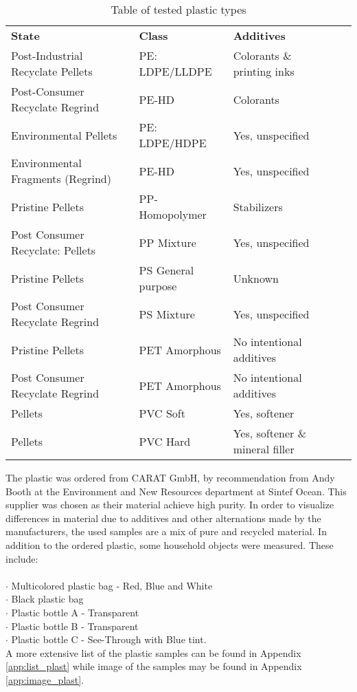 \begin{center}
\begin{table}[H]
\begin{tabular}{ |l|l|l|l|l| } 
 \hline
 \textbf{State} & \textbf{Class} & \textbf{Additives}\\ 
Post-Industrial Recyclate Pellets & PE: LDPE/LLDPE & Colorants \& printing inks\\
Post-Consumer Recyclate Regrind & PE-HD & Colorants\\
Environmental Pellets & PE: LDPE/HDPE & Yes, unspecified\\
Environmental Fragments (Regrind) & PE-HD & Yes, unspecified\\
Pristine Pellets & PP-Homopolymer & Stabilizers\\
Post Consumer Recyclate: Pellets & PP Mixture & Yes, unspecified\\
Pristine Pellets & PS General purpose & Unknown\\
Post Consumer Recyclate Regrind & PS Mixture & Yes, unspecified\\ 
Pristine Pellets & PET Amorphous & No intentional additives\\
Post Consumer Recyclate Regrind & PET Amorphous & No intentional additives\\
Pellets & PVC Soft & Yes, softener\\
Pellets & PVC Hard & Yes, softener \& mineral filler\\
 \hline
\end{tabular}
\caption{Table of tested plastic types} \label{tab:tested:plastic}
\end{table}
\end{center}
\noindent
The plastic was ordered from CARAT GmbH, by recommendation from Andy Booth at the Environment and New Resources department at Sintef Ocean. This supplier was chosen as their material achieve high purity. In order to visualize differences in material due to additives and other alternations made by the manufacturers, the used samples are a mix of pure and recycled material. In addition to the ordered plastic, some household objects were measured. These include:
\\\\
\noindent
$\cdot$ Multicolored plastic bag - Red, Blue and White\\
$\cdot$ Black plastic bag\\
$\cdot$ Plastic bottle A - Transparent\\
$\cdot$ Plastic bottle B - Transparent\\
$\cdot$ Plastic bottle C - See-Through with Blue tint.
\\
A more extensive list of the plastic samples can be found in Appendix \autoref{app:list_plast} while image of the samples may be found in Appendix \autoref{app:image_plast}.


